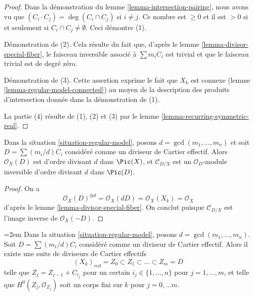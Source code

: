 \begin{proof}
Dans la démonstration du lemme \ref{lemma-intersection-pairing}, nous avons vu que
$(C_i \cdot C_j) = \deg(C_i \cap C_j)$ si $i \not = j$. Ce nombre est
$\geq 0$ et il est $> 0 $ si et seulement si $C_i \cap C_j \not = \emptyset$.
Ceci démontre (1).

\medskip\noindent
Démonstration de (2). Cela résulte du fait que, d'après le
lemme \ref{lemma-divisor-special-fiber}, le faisceau inversible associé à
$\sum m_i C_i$ est trivial et que le faisceau trivial est de degré zéro.

\medskip\noindent
Démonstration de (3). Cette assertion exprime le fait que $X_k$ est connexe
(lemme \ref{lemma-regular-model-connected})
au moyen de la description des produits d'intersection donnée dans la démonstration de (1).

\medskip\noindent
La partie (4) résulte de (1), (2) et (3) par le
lemme \ref{lemma-recurring-symmetric-real}.
\end{proof}

\begin{lemma}
\label{lemma-multiple-fibre-normal-bundle}
Dans la situation \ref{situation-regular-model}, posons $d = \gcd(m_1, \ldots, m_n)$
et soit $D = \sum (m_i/d)C_i$ considéré comme un diviseur de Cartier effectif.
Alors $\mathcal{O}_X(D)$ est d'ordre divisant $d$ dans $\Pic(X)$,
et $\mathcal{C}_{D/X}$ est un $\mathcal{O}_D$-module inversible
d'ordre divisant $d$ dans $\Pic(D)$.
\end{lemma}

\begin{proof}
On a
$$
\mathcal{O}_X(D)^{\otimes d} = \mathcal{O}_X(dD) =
\mathcal{O}_X(X_k) = \mathcal{O}_X
$$
d'après le lemme \ref{lemma-divisor-special-fiber}.
On conclut puisque $\mathcal{C}_{D/X}$ est l'image inverse de
$\mathcal{O}_X(-D)$.
\end{proof}

\begin{lemma}
\label{lemma-regular-model-field}
\begin{reference}
\cite[Lemma 2.6]{Artin-Winters}
\end{reference}
\begingroup
\emergencystretch=2em
Dans la situation \ref{situation-regular-model}, posons $d = \gcd(m_1, \ldots, m_n)$.
Soit $D = \sum (m_i/d) C_i$ considéré comme un diviseur de Cartier effectif. Alors il existe
une suite de diviseurs de Cartier effectifs
$$
(X_k)_{red} = Z_0 \subset Z_1 \subset \ldots \subset Z_m = D
$$
telle que $Z_j = Z_{j - 1} + C_{i_j}$ pour un certain $i_j \in \{1, \ldots, n\}$
pour $j = 1, \ldots, m$, et telle que $H^0(Z_j, \mathcal{O}_{Z_j})$
soit un corps fini sur $k$ pour $j = 0, \ldots m$.
\par
\endgroup
\end{lemma}

